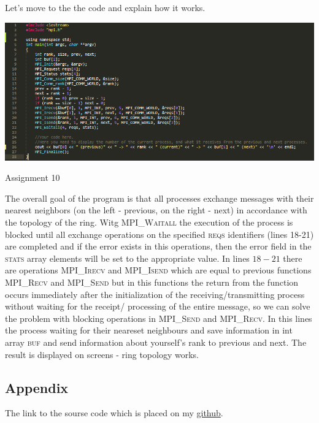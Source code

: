\documentclass[%
12pt, %
final, %
oneside, %
onecolumn, %
centertags]{article} %
\theoremstyle{plain}
\theoremstyle{definition}
\theoremstyle{remark}
\begin{document}
Let's move to the the code and explain how it works.

\begin{center}
\includegraphics[scale=0.75]{10.code.png}

Assignment 10
\end{center}

The overall goal of the program is that all processes exchange messages with their nearest neighbors (on the left - previous, on the right - next) in accordance with the topology of the ring. Witg \textsc{MPI\_Waitall} the execution of the process is blocked until all exchange operations on the specified \textsc{reqs} identifiers (lines 18-21) are completed and if the error exists in this operations, then the error field in the \textsc{stats} array elements will be set to the appropriate value. In lines $18-21$ there are operations \textsc{MPI\_Irecv} and \textsc{MPI\_Isend} which are equal to previous functions \textsc{MPI\_Recv} and \textsc{MPI\_Send} but in this functions the return from the function occurs immediately after the initialization of the receiving/transmitting process without waiting for the receipt/ processing of the entire message, so we can solve the problem with blocking operations in \textsc{MPI\_Send} and \textsc{MPI\_Recv}. In this lines the process waiting for their neareset neighbours and save information in int array \textsc{buf} and send information about yourself's rank to previous and next. The result is displayed on screens - ring topology works.



\subsection{Appendix}

The link to the sourse code which is placed on my \href{https://github.com/aptmess/parallel_algorithms}{github}.
\end{document}
